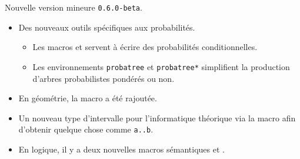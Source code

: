 Nouvelle version mineure \verb+0.6.0-beta+.

\begin{itemize}[itemsep=.5em]
    \item Des nouveaux outils spécifiques aux probabilités.
    \begin{itemize}[itemsep=.5em]
        \item Les macros  et  servent à écrire des probabilités conditionnelles.

        \item Les environnements \verb+probatree+ et \verb+probatree*+ simplifient la production d'arbres probabilistes pondérés ou non.
    \end{itemize}




    \item En géométrie, la macro  a été rajoutée.




    \item Un nouveau type d'intervalle pour l'informatique théorique via la macro  afin d'obtenir quelque chose comme \verb+a..b+.




    \item En logique, il y a deux nouvelles macros sémantiques  et .
\end{itemize}
